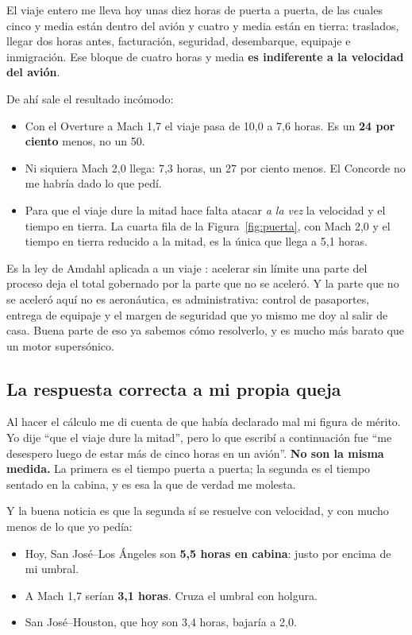 \documentclass[11pt,letterpaper]{article}
\begin{document}
El viaje entero me lleva hoy unas diez horas de puerta a puerta, de las cuales
cinco y media están dentro del avión y cuatro y media están en tierra:
traslados, llegar dos horas antes, facturación, seguridad, desembarque, equipaje
e inmigración. Ese bloque de cuatro horas y media \textbf{es indiferente a la
velocidad del avión}.

De ahí sale el resultado incómodo:

\begin{itemize}
\item Con el Overture a Mach 1,7 el viaje pasa de 10,0 a 7,6 horas. Es un
  \textbf{24 por ciento} menos, no un 50.
\item Ni siquiera Mach 2,0 llega: 7,3 horas, un 27 por ciento menos. El
  Concorde no me habría dado lo que pedí.
\item Para que el viaje dure la mitad hace falta atacar \emph{a la vez} la
  velocidad y el tiempo en tierra. La cuarta fila de la
  Figura~\ref{fig:puerta}, con Mach 2,0 y el tiempo en tierra reducido a la
  mitad, es la única que llega a 5,1 horas.
\end{itemize}

Es la ley de Amdahl aplicada a un viaje \parencite{amdahl1967}: acelerar sin
límite una parte del proceso deja el total gobernado por la parte que no se
aceleró. Y la parte que no se aceleró aquí no es aeronáutica, es
administrativa: control de pasaportes, entrega de equipaje y el margen de
seguridad que yo mismo me doy al salir de casa. Buena parte de eso ya sabemos
cómo resolverlo, y es mucho más barato que un motor supersónico.

\subsection{La respuesta correcta a mi propia queja}

Al hacer el cálculo me di cuenta de que había declarado mal mi figura de
mérito. Yo dije \enquote{que el viaje dure la mitad}, pero lo que escribí a
continuación fue \enquote{me desespero luego de estar más de cinco horas en un
avión}. \textbf{No son la misma medida.} La primera es el tiempo puerta a
puerta; la segunda es el tiempo sentado en la cabina, y es esa la que de verdad
me molesta.

Y la buena noticia es que la segunda sí se resuelve con velocidad, y con mucho
menos de lo que yo pedía:

\begin{itemize}
\item Hoy, San José--Los Ángeles son \textbf{5,5 horas en cabina}: justo por
  encima de mi umbral.
\item A Mach 1,7 serían \textbf{3,1 horas}. Cruza el umbral con holgura.
\item San José--Houston, que hoy son 3,4 horas, bajaría a 2,0.
\end{itemize}
\end{document}
